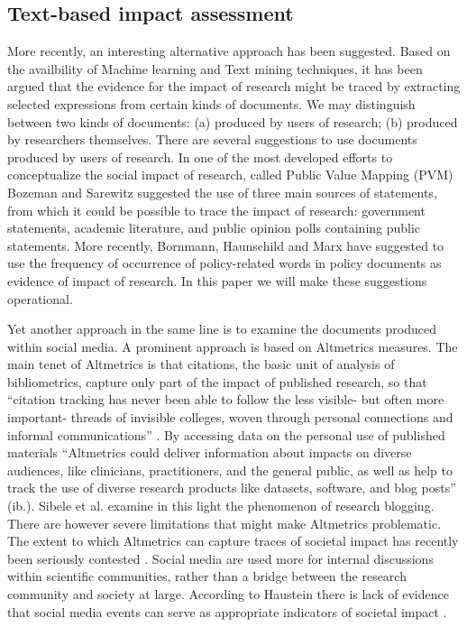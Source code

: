 \documentclass[]{book}
\begin{document}
\subsection{Text-based impact
assessment}\label{text-based-impact-assessment}

More recently, an interesting alternative approach has been suggested.
Based on the availbility of Machine learning and Text mining techniques,
it has been argued that the evidence for the impact of research might be
traced by extracting selected expressions from certain kinds of
documents. We may distinguish between two kinds of documents: (a)
produced by users of research; (b) produced by researchers themselves.
There are several suggestions to use documents produced by users of
research. In one of the most developed efforts to conceptualize the
social impact of research, called Public Value Mapping (PVM) Bozeman and
Sarewitz \citep{bozeman2011public} suggested the use of three main
sources of statements, from which it could be possible to trace the
impact of research: government statements, academic literature, and
public opinion polls containing public statements. More recently,
Bornmann, Haunschild and Marx \citep{bornmann2016policy} have suggested
to use the frequency of occurrence of policy-related words in policy
documents as evidence of impact of research. In this paper we will make
these suggestions operational.

Yet another approach in the same line is to examine the documents
produced within social media. A prominent approach is based on
Altmetrics measures. The main tenet of Altmetrics is that citations, the
basic unit of analysis of bibliometrics, capture only part of the impact
of published research, so that ``citation tracking has never been able
to follow the less visible- but often more important- threads of
invisible colleges, woven through personal connections and informal
communications'' \citep{priem2012altmetrics}. By accessing data on the
personal use of published materials ``Altmetrics could deliver
information about impacts on diverse audiences, like clinicians,
practitioners, and the general public, as well as help to track the use
of diverse research products like datasets, software, and blog posts''
(ib.). Sibele et al. \citep{fausto2012research} examine in this light
the phenomenon of research blogging. There are however severe
limitations that might make Altmetrics problematic. The extent to which
Altmetrics can capture traces of societal impact has recently been
seriously contested \citep{bornmann2014evaluate}. Social media are used
more for internal discussions within scientific communities, rather than
a bridge between the research community and society at large. According
to Haustein there is lack of evidence that social media events can serve
as appropriate indicators of societal impact \citep{haustein2016tweets}.
\end{document}
